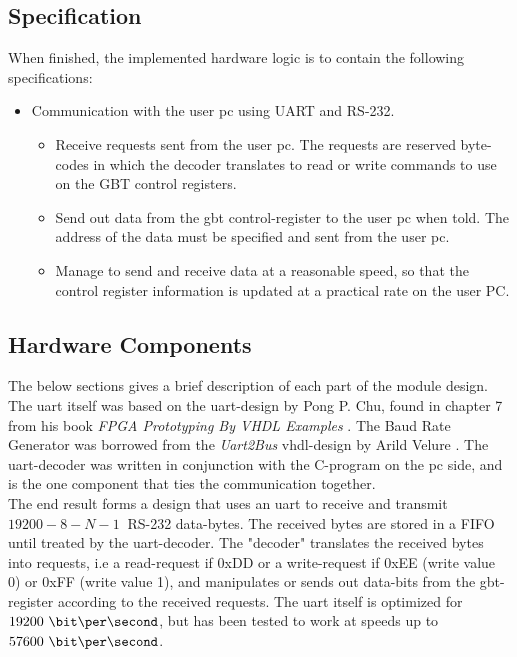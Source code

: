 \documentclass[main.tex]{subfiles}
\begin{document}
\subsection{Specification}

When finished, the implemented hardware logic is to contain the following specifications:\\
\begin{itemize} \setlength{\itemsep}{10pt}
\item Communication with the user \acrshort{pc} using UART and RS-232.
  \begin{itemize}
  \item Receive requests sent from the user \acrshort{pc}. The requests are reserved byte-codes in which the decoder translates to read or write commands to use on the GBT control registers. 
  \item Send out data from the \gls{gbt} control-register to the user \acrshort{pc} when told. The address of the data must be specified and sent from the user \acrshort{pc}.
  \item Manage to send and receive data at a reasonable speed, so that the control register information is updated at a practical rate on the user PC.
  \end{itemize}
\end{itemize}

\subsection{Hardware Components} \label{chap:hardcomp}

The below sections gives a brief description of each part of the module design.\\
The \gls{uart} itself was based on the \gls{uart}-design by Pong P. Chu, found in chapter 7 from his book \textit{FPGA Prototyping By VHDL Examples} \cite{chu08}. The Baud Rate Generator was borrowed from the \textit{Uart2Bus} \acrshort{vhdl}-design by Arild Velure \cite{velure10}. The \gls{uart}-decoder was written in conjunction with the C-program on the \acrshort{pc} side, and is the one component that ties the communication together.\\

The end result forms a design that uses an \gls{uart} to receive and transmit $19200-8-N-1~$ RS-232 data-bytes. The received bytes are stored in a FIFO until treated by the \gls{uart}-decoder. The "decoder" translates the received bytes into requests, i.e a read-request if 0xDD or a write-request if 0xEE (write value 0) or 0xFF (write value 1), and manipulates or sends out data-bits from the \gls{gbt}-register according to the received requests. The \gls{uart} itself is optimized for $19200~\bit\per\second$, but has been tested to work at speeds up to $57600~\bit\per\second$.
\end{document}
